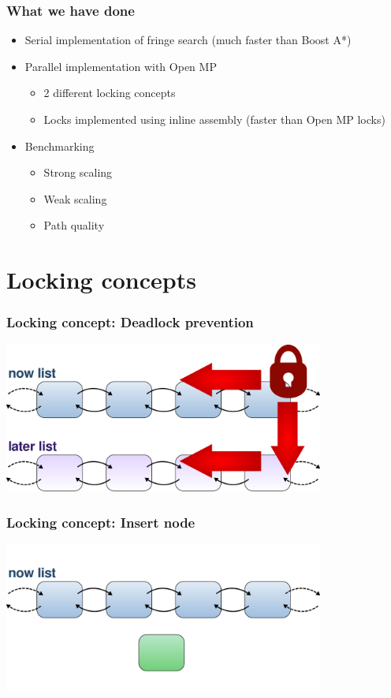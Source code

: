 \documentclass{beamer}
\begin{document}
\begin{frame}
\frametitle{What we have done}
\begin{itemize}
\item Serial implementation of fringe search (much faster than Boost A*)
\item Parallel implementation with Open MP
	\begin{itemize}
	\item 2 different locking concepts
	\item Locks implemented using inline assembly (faster than Open MP locks)
	\end{itemize}
\item Benchmarking
	\begin{itemize}
	\item Strong scaling
	\item Weak scaling
	\item Path quality
	\end{itemize}
\end{itemize}
\end{frame}

\section{Locking concepts}

\begin{frame}
\frametitle{Locking concept: Deadlock prevention}
\begin{center}
	\includegraphics[height=140pt]{locking.pdf}
\end{center}
\end{frame}

\begin{frame}
\frametitle{Locking concept: Insert node}
\begin{center}
	\includegraphics[height=140pt]{insert1.pdf}
\end{center}
\end{frame}
\end{document}
